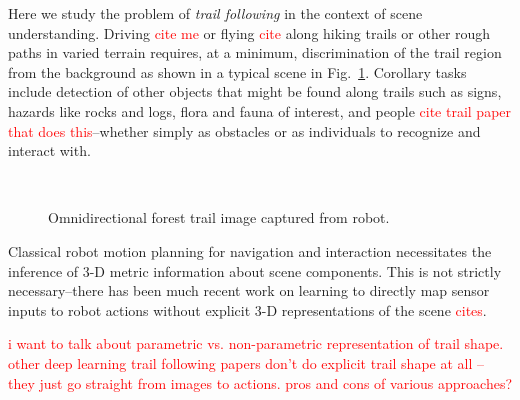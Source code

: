 \documentclass[letterpaper, 10 pt, conference]{ieeeconf}  %
\newcommand{\comment}[1]{\textcolor{red}{#1}}
\begin{document}
Here we study the problem of \textit{trail following} in the context
of scene understanding.  Driving \comment{cite me} or flying
\comment{cite} along hiking trails or other rough paths in varied
terrain requires, at a minimum, discrimination of the trail region
from the background as shown in a typical scene in
Fig.~\ref{fig:raw_trail}.  Corollary tasks include detection of other
objects that might be found along trails such as signs, hazards like rocks and logs, flora and fauna of interest, and people \comment{cite trail paper that does this}--whether simply as obstacles or as individuals to recognize and interact with.


\begin{figure}[!t]
\captionsetup[subfigure]{labelformat=empty}
\\
\caption{Omnidirectional forest trail image captured from robot.}
\label{fig:raw_trail}
\end{figure}


Classical robot motion planning for navigation and interaction
necessitates the inference of 3-D metric information about scene
components.  This is not strictly necessary--there has been much recent work
on learning to directly map sensor inputs to robot actions without explicit 3-D
representations of the scene \comment{cites}.

\comment{i want to talk about parametric vs. non-parametric
  representation of trail shape.  other deep learning trail following papers don't
  do explicit trail shape at all -- they just go straight from images
  to actions.  pros and cons of various approaches?}
\end{document}
